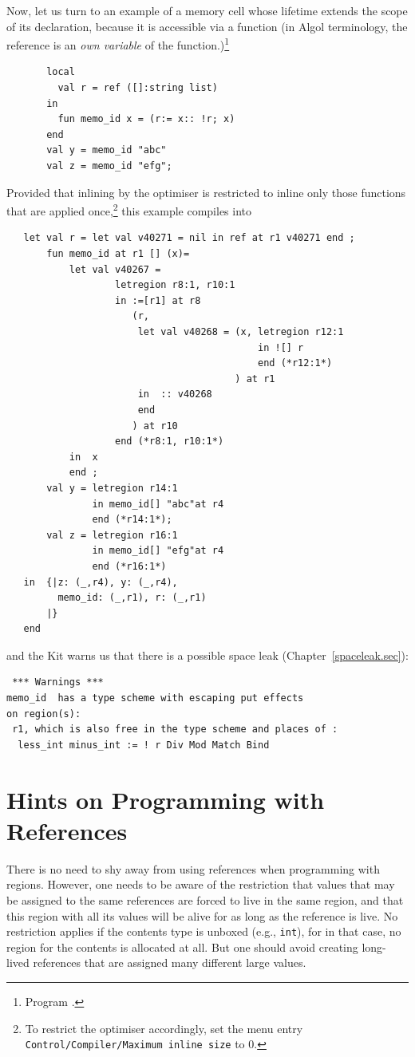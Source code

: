 \documentclass[12pt]{book}
\begin{document}
Now, let us turn to an example of a memory cell whose lifetime
extends the scope of its declaration, because it is
accessible via a function (in Algol terminology,
the reference is an {\em own variable} of the function.)\footnote{Program .}
\begin{verbatim}
       local
         val r = ref ([]:string list)
       in
         fun memo_id x = (r:= x:: !r; x)
       end
       val y = memo_id "abc"
       val z = memo_id "efg";
\end{verbatim}
Provided that inlining by the optimiser is restricted to inline only
those functions that are applied once,\footnote{To restrict the
  optimiser accordingly, set the menu entry {\tt Control/Compiler/Maximum
    inline size} to 0.} this example compiles into
\begin{verbatim}
   let val r = let val v40271 = nil in ref at r1 v40271 end ; 
       fun memo_id at r1 [] (x)= 
           let val v40267 = 
                   letregion r8:1, r10:1 
                   in :=[r1] at r8 
                      (r, 
                       let val v40268 = (x, letregion r12:1 
                                            in ![] r 
                                            end (*r12:1*)
                                        ) at r1
                       in  :: v40268
                       end 
                      ) at r10 
                   end (*r8:1, r10:1*)
           in  x
           end ; 
       val y = letregion r14:1 
               in memo_id[] "abc"at r4 
               end (*r14:1*); 
       val z = letregion r16:1 
               in memo_id[] "efg"at r4 
               end (*r16:1*)
   in  {|z: (_,r4), y: (_,r4), 
         memo_id: (_,r1), r: (_,r1)
       |}
   end 
\end{verbatim}
and the Kit warns us that there is a possible space leak (Chapter~\ref{spaceleak.sec}):
\begin{verbatim}
 *** Warnings ***
memo_id  has a type scheme with escaping put effects 
on region(s): 
 r1, which is also free in the type scheme and places of :  
  less_int minus_int := ! r Div Mod Match Bind
\end{verbatim}

\section{Hints on Programming  with References}
There is no need to shy away from using references when programming
with regions. However, one needs to be aware of the restriction that
values that may be assigned to the same references are forced to live
in the same region, and that this region with all its values will be alive
for as long as the reference is live. No restriction applies if the
contents type is unboxed (e.g., {\tt int}), for in that case, no region
for the contents is allocated at all. But one should avoid creating
long-lived references that are assigned many different large values.
\end{document}

